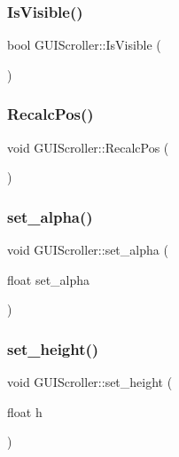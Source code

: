 \hypertarget{class_g_u_i_scroller_aaac31becef8538d7e5565766825674b8}{}\label{class_g_u_i_scroller_aaac31becef8538d7e5565766825674b8} 
\subsubsection{\texorpdfstring{Is\+Visible()}{IsVisible()}}
{\footnotesize\ttfamily bool G\+U\+I\+Scroller\+::\+Is\+Visible (\begin{DoxyParamCaption}{ }\end{DoxyParamCaption})}

\hypertarget{class_g_u_i_scroller_acbaf8ba05df2a262692e654221885df5}{}\label{class_g_u_i_scroller_acbaf8ba05df2a262692e654221885df5} 
\subsubsection{\texorpdfstring{Recalc\+Pos()}{RecalcPos()}}
{\footnotesize\ttfamily void G\+U\+I\+Scroller\+::\+Recalc\+Pos (\begin{DoxyParamCaption}{ }\end{DoxyParamCaption})}

\hypertarget{class_g_u_i_scroller_a7372e6331db0508eb10a8bd07899b8f5}{}\label{class_g_u_i_scroller_a7372e6331db0508eb10a8bd07899b8f5} 
\subsubsection{\texorpdfstring{set\+\_\+alpha()}{set\_alpha()}}
{\footnotesize\ttfamily void G\+U\+I\+Scroller\+::set\+\_\+alpha (\begin{DoxyParamCaption}\item[{float}]{set\+\_\+alpha }\end{DoxyParamCaption})}

\hypertarget{class_g_u_i_scroller_a3c2b983e77ed29755daf09fde2d8b0cc}{}\label{class_g_u_i_scroller_a3c2b983e77ed29755daf09fde2d8b0cc} 
\subsubsection{\texorpdfstring{set\+\_\+height()}{set\_height()}}
{\footnotesize\ttfamily void G\+U\+I\+Scroller\+::set\+\_\+height (\begin{DoxyParamCaption}\item[{float}]{h }\end{DoxyParamCaption})}


